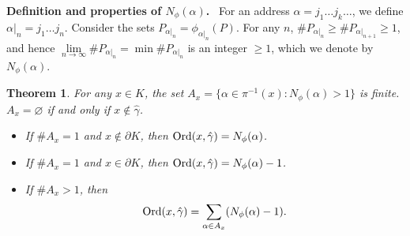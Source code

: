 \documentclass[11pt,reqno]{amsart}
\newtheorem{theorem}{Theorem}[section]
\newcommand{\Ord}{\mathop{\rm Ord}\nolimits}
\newcommand{\al}{{\alpha}}
\newcommand{\hga}{{\hat\gamma}}
\newcommand{\Nfi}{{N_\phi}}
\begin{document}
{\bf Definition and properties of     $\Nfi(\al)$. }\ For an address $\al=j_1\ldots j_k\ldots $, we define $\al|_n=j_1\ldots j_n $. Consider the sets $P_{\al|_n}=\phi_{\al|_n}(P)$.
For any $n$, $\#P_{\alpha|_n}\ge \#P_{\alpha|_{n+1}}\ge 1$, and hence
$\lim\limits_{n\to\infty}\#P_{\alpha|_n}=\min \#P_{\alpha|_n}$ is an integer $\ge 1$, which we denote by $\Nfi(\al)$.



  
\begin{theorem}\label{ord_b}
For any $x\in K$, the set $A_x=\{\alpha\in\pi^{-1}(x):\Nfi(\alpha)  > 1\} $ is finite.  $A_x=\varnothing$ if and only if $x\notin\hat\gamma$.
\begin{itemize}
   
     \item [1)] If $\#A_x=1$ and $x\notin  \partial K$, then  ${\mathop{\rm Ord} \nolimits}(x,\hga) =  \Nfi(\alpha) $.
      \item [2)] If $\#A_x=1$ and $x\in  \partial K$, then  
     ${\mathop{\rm Ord} \nolimits}(x,\hga) =  \Nfi(\alpha)  - 1$.
     \item [3)] 
If $\#A_x>1$, then 
    \begin{equation}
      {\Ord}(x,\hga)= \sum\limits_{\alpha\in A_x} (\Nfi(\alpha)  - 1). 
    \end{equation}
     \end{itemize}
\end{theorem}
 
\end{document}
